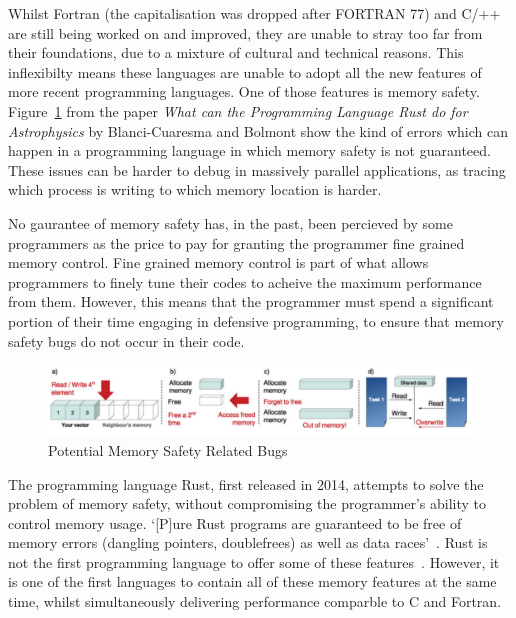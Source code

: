 \documentclass{report}
\begin{document}
Whilst Fortran (the capitalisation was dropped after FORTRAN 77) and C/++ are still being worked on and improved, they are unable to stray too far from their foundations, due to a mixture of cultural and technical reasons. This inflexibilty means these languages are unable to adopt all the new features of more recent programming languages. One of those features is memory safety. Figure~\ref{fig:mem} from the paper \textit{What can the Programming Language Rust do for Astrophysics} by Blanci-Cuaresma and Bolmont show the kind of errors which can happen in a programming language in which memory safety is not guaranteed. These issues can be harder to debug in massively parallel applications, as tracing which process is writing to which memory location is harder.

No gaurantee of memory safety has, in the past, been percieved by some programmers as the price to pay for granting the programmer fine grained memory control. Fine grained memory control is part of what allows programmers to finely tune their codes to acheive the maximum performance from them. However, this means that the programmer must spend a significant portion of their time engaging in defensive programming, to ensure that memory safety bugs do not occur in their code.


\begin{figure}[h]
  \centering
  \includegraphics[width=\linewidth]{figures/memory-safety.png}
  \caption{Potential Memory Safety Related Bugs~\cite{blanco-cuaresma_bolmont_2016}}
  \label{fig:mem}
\end{figure}

The programming language Rust, first released in 2014, attempts to solve the problem of memory safety, without compromising the programmer's ability to control memory usage. `[P]ure Rust programs are guaranteed to be free of memory errors (dangling pointers, doublefrees) as well as data races'~\cite{Matsakis:2014}. Rust is not the first programming language to offer some of these features~\cite{Manson:2005:JMM:1047659.1040336}\cite{pygc}\cite{jones1996concurrent}. However, it is one of the first languages to contain all of these memory features at the same time, whilst simultaneously delivering performance comparble to C and Fortran.
\end{document}
